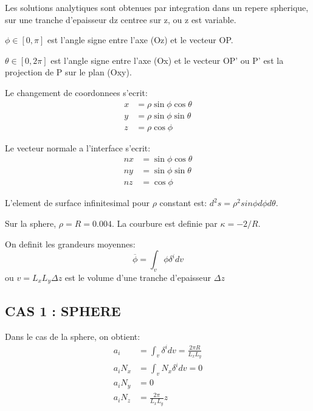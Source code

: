 Les solutions analytiques sont obtenues par integration dans un repere spherique, sur une tranche d'epaisseur dz centree sur z, ou z est variable. 

$\phi \in [0,\pi]$ est l'angle signe entre l'axe (Oz) et le vecteur OP.

$\theta \in [0,2\pi]$ est l'angle signe entre l'axe (Ox) et le vecteur OP' ou P' est la projection de P sur le plan (Oxy).

Le changement de coordonnees s'ecrit:
\begin{subequations}
\begin{align}
x&=\rho \sin \phi \cos \theta \\
y&=\rho \sin \phi \sin \theta \\
z&=\rho \cos \phi
\end{align}
\end{subequations}

Le vecteur normale a l'interface s'ecrit:
\begin{subequations}
\begin{align}
nx&=\sin \phi \cos \theta\\
ny&=\sin \phi \sin \theta\\
nz&=\cos \phi 
\end{align}
\end{subequations}

L'element de surface infinitesimal pour $\rho$ constant est:
$d^2s = \rho^2 sin \phi d\phi d\theta$.

Sur la sphere, $\rho = R=0.004$. La courbure est definie par $\kappa = -2/R$.

On definit les grandeurs moyennes:
$$\overline{\phi} = \int_v \phi \delta^i dv $$
ou $v=L_x L_y \Delta z$ est le volume d'une tranche d'epaisseur $\Delta z$

\subsection{CAS 1 : SPHERE }

Dans le cas de la sphere, on obtient:
\begin{subequations}
\begin{align}
  a_i    &= \int_v \delta^i dv = \frac{2\pi R}{L_xL_y} \\
  a_iN_x &= \int_v N_x \delta^i dv = 0 \\
  a_iN_y &= 0 \\
  a_iN_z &= \frac{2\pi}{L_xL_y} z 
\end{align}
\end{subequations}

